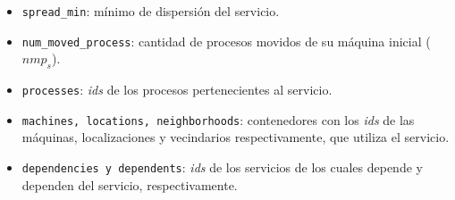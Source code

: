 \documentclass[../informe2.tex]{subfiles}
\begin{document}
\noindent\begin{minipage}{0.5\textwidth}
	\small
	\begin{itemize}[leftmargin=*]
		\item \texttt{spread\_min}: mínimo de dispersión del servicio.
		\item \texttt{num\_moved\_process}: cantidad de procesos movidos de su máquina inicial ($nmp_s$).
		\item \texttt{processes}: \textit{ids} de los procesos pertenecientes al servicio.
 		\item \texttt{machines, locations, neighborhoods}: contenedores con los \textit{ids} de las máquinas, localizaciones y vecindarios respectivamente, que utiliza el servicio.
 		\item \texttt{dependencies y dependents}: \textit{ids} de los servicios de los cuales depende y dependen del servicio, respectivamente.
	\end{itemize}
\end{minipage}\hfill
\begin{minipage}{0.4\textwidth}
\end{minipage}

\vspace{1cm}
\end{document}
